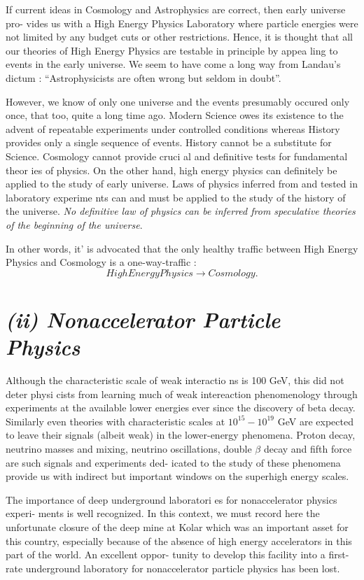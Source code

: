 If current ideas in Cosmology
and Astrophysics are correct, then early universe pro-
vides us with a High Energy Physics Laboratory where particle energies were not limited by any budget cuts or other restrictions. Hence,
it is thought that all our theories of High
Energy Physics are testable in principle by appea
ling to events in the early universe. We
seem
to have come a long way from Landau’s dictum
: ``Astrophysicists are often wrong
but seldom in doubt”.


However, we know of only one universe and
the events presumably occured only once,
that
too, quite a long time ago. Modern Science owes
its existence to the advent of
repeatable experiments under controlled conditions
whereas History provides only a single
sequence of events. History cannot be a substitute
for Science. Cosmology cannot provide
cruci
al and definitive tests for fundamental theor
ies of physics. On the other hand, high
energy physics can definitely be applied to the
study of early universe. Laws of physics
inferred from and tested in laboratory experime
nts can and must be applied to the study
of the history of the universe. \textit{No definitive law
of physics can be inferred from speculative
theories of the beginning of the universe}.


In other words, it’ is advocated that the only
healthy traffic between High Energy
Physics and Cosmology is a one-way-traffic :
$$
High Energy Physics \rightarrow Cosmology.
$$


\newpage

\section*{\it (ii) Nonaccelerator Particle Physics}


Although the characteristic scale of weak interactio
ns is 100 GeV, this did not deter
physi
cists from learning much of weak intereaction
phenomenology through experiments
at the available lower energies ever since the
discovery of beta decay. Similarly even
theories with characteristic scales at $10^{15} - 10^{19}$ GeV
are expected to leave their signals
(albeit weak) in the lower-energy phenomena.
Proton decay, neutrino masses and
mixing,
neutrino oscillations, double $\beta$ decay and fifth force
are such signals and experiments ded-
icated to the study of these phenomena provide
us with indirect but important windows
on the superhigh energy scales.


The importance of deep underground laboratori
es for nonaccelerator physics experi-
ments is well recognized. In this context, we must
record here the unfortunate closure of
the deep mine at Kolar which was an important asset
for this country, especially because
of the absence of high energy accelerators in this
part of the world. An excellent oppor-
tunity to develop this facility into a first-rate
underground laboratory for nonaccelerator
particle physics has been lost.


